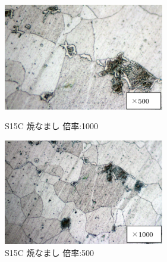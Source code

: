 \documentclass[10pt,a4j]{jsarticle}
\begin{document}
  \begin{figure}[htbp]
    \begin{minipage}{0.5\hsize}
      \begin{center}
        \includegraphics[width=7cm]{../img/S15C_yakinamashi_500.png}
        \caption{S15C 焼なまし 倍率:1000}
      \end{center}
    \end{minipage}
    \begin{minipage}{0.5\hsize}
      \begin{center}
        \includegraphics[width=7cm]{../img/S15C_yakinamashi_1000.png}
        \caption{S15C 焼なまし 倍率:500}
      \end{center}
    \end{minipage}
  \end{figure}
\end{document}
